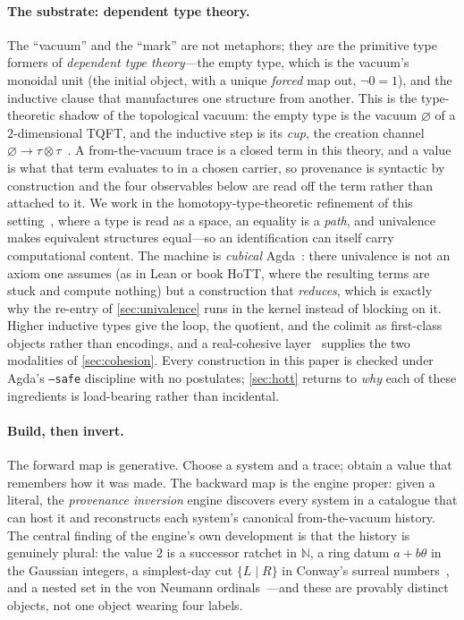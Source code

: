 \documentclass[11pt,letterpaper]{article}
\theoremstyle{plain}
\theoremstyle{definition}
\theoremstyle{remark}
\newcommand{\NN}{\mathbb{N}}
\begin{document}
\paragraph{The substrate: dependent type theory.}
The ``vacuum'' and the ``mark'' are not metaphors; they are the primitive type
formers of \emph{dependent type theory}---the empty type, which is the vacuum's
monoidal unit (the initial object, with a unique \emph{forced} map out, $\neg 0 = 1$),
and the inductive clause that manufactures one structure from another. This is the
type-theoretic shadow of the topological vacuum: the empty type is the vacuum $\varnothing$
of a $2$-dimensional TQFT, and the inductive step is its \emph{cup}, the creation
channel $\varnothing\to\tau\otimes\tau$~\citep{kock2004,iaom_quantum_atlas}. A
from-the-vacuum trace is a closed term in this theory, and a value is what that term
evaluates to in a chosen carrier, so provenance is syntactic by construction and the
four observables below are read off the term rather than attached to it. We work in
the homotopy-type-theoretic refinement of this setting~\citep{voevodsky2014univalent},
where a type is read as a space, an equality is a \emph{path}, and univalence makes
equivalent structures equal---so an identification can itself carry computational
content. The machine is \emph{cubical} Agda~\citep{cohen2018cubical,vezzosi2019cubical}:
there univalence is not an axiom one assumes (as in Lean or book HoTT, where the
resulting terms are stuck and compute nothing) but a construction that
\emph{reduces}, which is exactly why the re-entry of \cref{sec:univalence} runs in
the kernel instead of blocking on it. Higher inductive types give the loop, the
quotient, and the colimit as first-class objects rather than encodings, and a
real-cohesive layer~\citep{shulman2018brouwer} supplies the two modalities of
\cref{sec:cohesion}. Every construction in this paper is checked under Agda's
\texttt{--safe} discipline with no postulates; \cref{sec:hott} returns to \emph{why}
each of these ingredients is load-bearing rather than incidental.

\paragraph{Build, then invert.}
The forward map is generative. Choose a system and a trace; obtain a value that
remembers how it was made. The backward map is the engine proper: given a literal,
the \emph{provenance inversion} engine discovers every system in a catalogue that
can host it and reconstructs each system's canonical from-the-vacuum history. The
central finding of the engine's own development is that the history is genuinely
plural: the value $2$ is a successor ratchet in $\NN$, a ring datum $a+b\theta$ in
the Gaussian integers, a simplest-day cut $\{L\mid R\}$ in Conway's surreal
numbers~\citep{conway2001onag}, and a nested set in the von Neumann
ordinals~\citep{vonneumann1923ordinals}---and these are provably distinct
objects, not one object wearing four labels.
\end{document}
